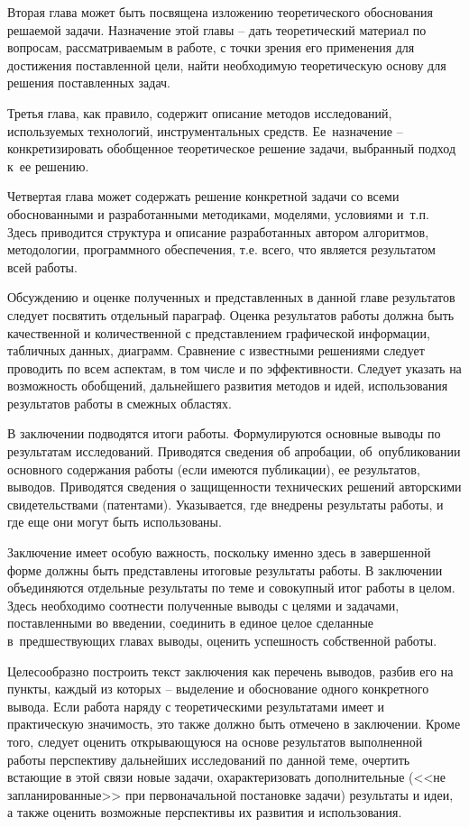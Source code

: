 \documentclass[PI,VKR]{HSEUniversity}
\begin{document}
Вторая глава может быть посвящена изложению теоретического обоснования решаемой задачи. Назначение этой главы – дать теоретический материал по вопросам, рассматриваемым в работе, с точки зрения его применения для достижения поставленной цели, найти необходимую теоретическую основу для решения поставленных задач.

Третья глава, как правило, содержит описание методов исследований, используемых технологий, инструментальных средств. Ее назначение – конкретизировать обобщенное теоретическое решение задачи, выбранный подход к ее решению.

Четвертая глава может содержать решение конкретной задачи со всеми обоснованными и разработанными методиками, моделями, условиями и т.п. Здесь приводится структура и описание разработанных автором алгоритмов, методологии, программного обеспечения, т.е. всего, что является результатом всей работы.

Обсуждению и оценке полученных и представленных в данной главе результатов следует посвятить отдельный параграф. Оценка результатов работы должна быть качественной и количественной с представлением графической информации, табличных данных, диаграмм. Сравнение с известными решениями следует проводить по всем аспектам, в том числе и по эффективности. Следует указать на возможность обобщений, дальнейшего развития методов и идей, использования результатов работы в смежных областях.

В заключении подводятся итоги работы. Формулируются основные выводы по результатам исследований. Приводятся сведения об апробации, об опубликовании основного содержания работы (если имеются публикации), ее результатов, выводов. Приводятся сведения о защищенности технических решений авторскими свидетельствами (патентами). Указывается, где внедрены результаты работы, и где еще они могут быть использованы.

Заключение имеет особую важность, поскольку именно здесь в завершенной форме должны быть представлены итоговые результаты работы. В заключении объединяются отдельные результаты по теме и совокупный итог работы в целом. Здесь необходимо соотнести полученные выводы с целями и задачами, поставленными во введении, соединить в единое целое сделанные в предшествующих главах выводы, оценить успешность собственной работы.

Целесообразно построить текст заключения как перечень выводов, разбив его на пункты, каждый из которых – выделение и обоснование одного конкретного вывода. Если работа наряду с теоретическими результатами имеет и практическую значимость, это также должно быть отмечено в заключении.
Кроме того, следует оценить открывающуюся на основе результатов выполненной работы перспективу дальнейших исследований по данной теме, очертить встающие в этой связи новые задачи, охарактеризовать дополнительные (<<не запланированные>> при первоначальной постановке задачи) результаты и идеи, а также оценить возможные перспективы их развития и использования.
\end{document}
